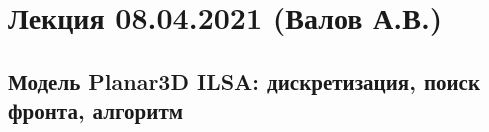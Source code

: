 \documentclass[main.tex]{subfiles}
\begin{document}

\section{Лекция 08.04.2021 (Валов А.В.)}

\subsection{Модель Planar3D ILSA: дискретизация, поиск фронта, алгоритм}
\end{document}
